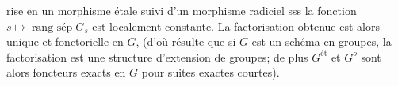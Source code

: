 
rise en un morphisme  étale suivi d'un morphisme radiciel sss la fonction $s\mapsto\operatorname{rang\ sép}G_s$ est localement constante. La factorisation obtenue est alors unique et fonctorielle en $G$,  (d'où résulte que si $G$ est un schéma en groupes, la factorisation est une structure d'extension de groupes; de plus $G^{\mathrm{ét}}$ et $G^o$ sont alors foncteurs exacts en $G$ pour suites exactes courtes).
